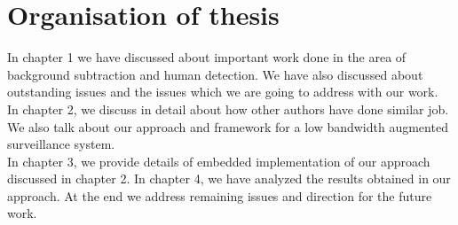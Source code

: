 \section{Organisation of thesis}
\indent In chapter 1 we have discussed about important work done in the
area of background subtraction and human detection. We have also
discussed about outstanding issues and the issues which we are going to
address with our work.\\
\indent In chapter 2, we discuss in detail about how other authors
have done similar job. We also talk about our approach and
framework for a low bandwidth augmented surveillance system.\\
\indent In chapter 3, we provide details of embedded implementation of
our approach discussed in chapter 2.
\indent In chapter 4, we have analyzed the results obtained in our
approach. At the end we address remaining issues and direction for the
future work.
